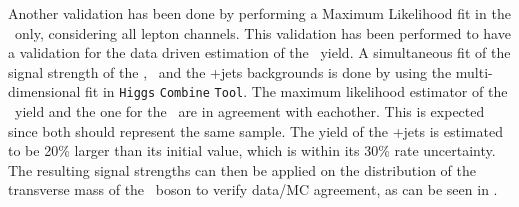 Another validation has been done by performing a Maximum Likelihood fit in the \WZCR\ only, considering all lepton channels. This validation has been performed to have a validation for the data driven estimation of the \NPL\ yield. A simultaneous fit of the signal strength of the \NPE, \NPM\ and the \WZ+jets backgrounds is done by using the multi-dimensional fit in \texttt{Higgs} \texttt{Combine} \texttt{Tool}. The maximum likelihood estimator of the \NPM\ yield and the one for the \NPE\ are in agreement with eachother. This is expected since both should represent the same sample. The yield of the \WZ+jets is estimated to be 20\% larger than its initial value, which is within its 30\% rate uncertainty. The resulting signal strengths can then be applied on the distribution of the transverse mass of the \PW\ boson to verify data/MC agreement, as can be seen in . %


